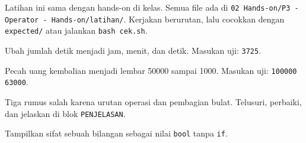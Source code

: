 \documentclass[a4paper]{article}
\begin{document}
Latihan ini sama dengan hands-on di kelas. Semua file ada di \texttt{02 Hands-on/P3 - Operator - Hands-on/latihan/}. Kerjakan berurutan, lalu cocokkan dengan \texttt{expected/} atau jalankan \texttt{bash cek.sh}.
\par\vspace{4pt}\par\vspace{6pt}
Ubah jumlah detik menjadi jam, menit, dan detik. Masukan uji: \texttt{3725}.

Pecah uang kembalian menjadi lembar 50000 sampai 1000. Masukan uji: \texttt{100000 63000}.

Tiga rumus salah karena urutan operasi dan pembagian bulat. Telusuri, perbaiki, dan jelaskan di blok \texttt{PENJELASAN}.

Tampilkan sifat sebuah bilangan sebagai nilai \texttt{bool} tanpa \texttt{if}.
\end{document}
